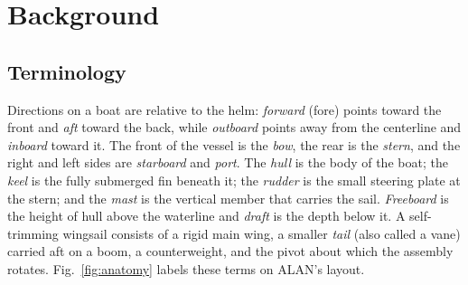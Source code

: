 \section{Background}
\label{sec:background}

\subsection{Terminology}
Directions on a boat are relative to the helm: \emph{forward} (fore) points
toward the front and \emph{aft} toward the back, while \emph{outboard} points
away from the centerline and \emph{inboard} toward it. The front of the vessel
is the \emph{bow}, the rear is the \emph{stern}, and the right and left sides
are \emph{starboard} and \emph{port}. The \emph{hull} is the body of the boat;
the \emph{keel} is the fully submerged fin beneath it; the \emph{rudder} is the
small steering plate at the stern; and the \emph{mast} is the vertical member
that carries the sail. \emph{Freeboard} is the height of hull above the
waterline and \emph{draft} is the depth below it. A self-trimming wingsail
consists of a rigid main wing, a smaller
\emph{tail} (also called a vane) carried aft on a boom, a counterweight, and
the pivot about which the assembly rotates. Fig.~\ref{fig:anatomy} labels
these terms on ALAN's layout.


